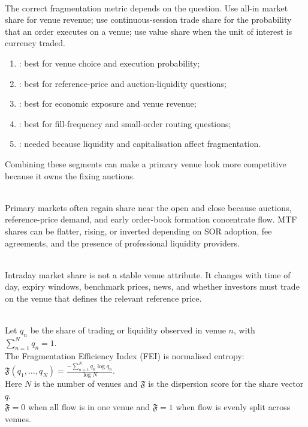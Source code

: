 \begin{caveat} \\
The correct fragmentation metric depends on the question. Use all-in market share for venue revenue; use continuous-session trade share for the probability that an order executes on a venue; use value share when the unit of interest is currency traded.
\end{caveat}

\begin{taxonomy} 
\begin{enumerate}[label=\roman*.]
\setlength{\itemsep}{0pt}
\item {}: best for venue choice and execution probability;
\item {}: best for reference-price and auction-liquidity questions;
\item {}: best for economic exposure and venue revenue;
\item {}: best for fill-frequency and small-order routing questions;
\item {}: needed because liquidity and capitalisation affect fragmentation.
\end{enumerate}
Combining these segments can make a primary venue look more competitive because it owns the fixing auctions.
\end{taxonomy}

\begin{empiricalfinding} \\
Primary markets often regain share near the open and close because auctions, reference-price demand, and early order-book formation concentrate flow. MTF shares can be flatter, rising, or inverted depending on SOR adoption, fee agreements, and the presence of professional liquidity providers.
\end{empiricalfinding}

\begin{caveat} \\
Intraday market share is not a stable venue attribute. It changes with time of day, expiry windows, benchmark prices, news, and whether investors must trade on the venue that defines the relevant reference price.
\end{caveat}

\begin{definition} \\
Let $q_n$ be the share of trading or liquidity observed in venue $n$, with $\sum_{n=1}^{N}q_n=1$.\\
The Fragmentation Efficiency Index (FEI) is normalised entropy: $\mathfrak{F}(q_1,\ldots,q_N)=\frac{-\sum_{n=1}^{N}q_n\log q_n}{\log N}$.\\
Here $N$ is the number of venues and $\mathfrak{F}$ is the dispersion score for the share vector $q$.\\
$\mathfrak{F}=0$ when all flow is in one venue and $\mathfrak{F}=1$ when flow is evenly split across venues.
\end{definition}

